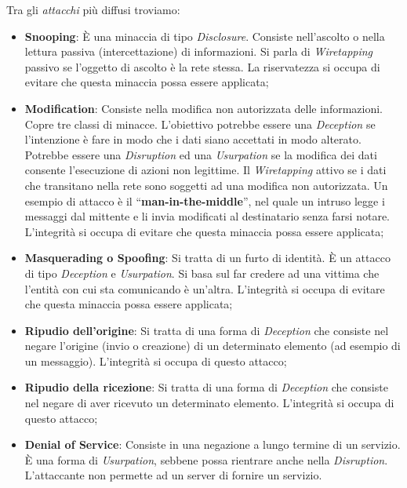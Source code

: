 Tra gli \textit{attacchi} più diffusi troviamo:

\begin{itemize}
      \item \textbf{Snooping}: È una minaccia di tipo \textit{Disclosure}.
            Consiste nell’ascolto o nella lettura passiva (intercettazione) di
            informazioni. Si parla di \textit{Wiretapping} passivo se l’oggetto
            di ascolto è la rete stessa. La riservatezza si occupa di evitare
            che questa minaccia possa essere applicata;
      \item \textbf{Modification}: Consiste nella modifica non autorizzata delle
            informazioni. Copre tre classi di minacce. L’obiettivo potrebbe essere
            una \textit{Deception} se l’intenzione è fare in modo che i dati siano
            accettati in modo alterato. Potrebbe essere una \textit{Disruption}
            ed una \textit{Usurpation} se la modifica dei dati consente l’esecuzione
            di azioni non legittime. Il \textit{Wiretapping} attivo se i dati che
            transitano nella rete sono soggetti ad una modifica non autorizzata.
            Un esempio di attacco è il “\textbf{man-in-the-middle}”, nel quale un
            intruso legge i messaggi dal mittente e li invia modificati al
            destinatario senza farsi notare. L’integrità si occupa di evitare che
            questa minaccia possa essere applicata;
      \item \textbf{Masquerading o Spoofing}: Si tratta di un furto di identità.
            È un attacco di tipo \textit{Deception} e \textit{Usurpation}.
            Si basa sul far credere ad una vittima che l’entità con cui sta
            comunicando è un’altra. L’integrità si occupa di evitare che questa
            minaccia possa essere applicata;
      \item \textbf{Ripudio dell’origine}: Si tratta di una forma di \textit{Deception}
            che consiste nel negare l’origine (invio o creazione) di un determinato
            elemento (ad esempio di un messaggio). L’integrità si occupa di questo
            attacco;
      \item \textbf{Ripudio della ricezione}: Si tratta di una forma di \textit{Deception}
            che consiste nel negare di aver ricevuto un determinato elemento.
            L’integrità si occupa di questo attacco;
      \item \textbf{Denial of Service}: Consiste in una negazione a lungo termine
            di un servizio. È una forma di \textit{Usurpation}, sebbene possa
            rientrare anche nella \textit{Disruption}. L’attaccante non permette
            ad un server di fornire un servizio.
\end{itemize}

